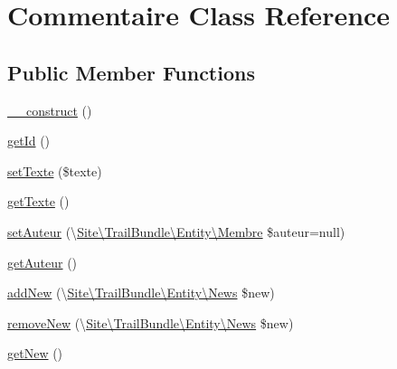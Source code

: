 \hypertarget{class_site_1_1_trail_bundle_1_1_entity_1_1_commentaire}{}\section{Commentaire Class Reference}
\label{class_site_1_1_trail_bundle_1_1_entity_1_1_commentaire}
\subsection*{Public Member Functions}
\begin{DoxyCompactItemize}
\item 
\hyperlink{class_site_1_1_trail_bundle_1_1_entity_1_1_commentaire_a095c5d389db211932136b53f25f39685}{\+\_\+\+\_\+construct} ()
\item 
\hyperlink{class_site_1_1_trail_bundle_1_1_entity_1_1_commentaire_a12251d0c022e9e21c137a105ff683f13}{get\+Id} ()
\item 
\hyperlink{class_site_1_1_trail_bundle_1_1_entity_1_1_commentaire_a77be937e871225b0ec6f0c35b2547008}{set\+Texte} (\$texte)
\item 
\hyperlink{class_site_1_1_trail_bundle_1_1_entity_1_1_commentaire_a8986201ce046ed1b2e684a7d36cdf8ff}{get\+Texte} ()
\item 
\hyperlink{class_site_1_1_trail_bundle_1_1_entity_1_1_commentaire_a78acaef31f36bb40b76345e2a49f7fde}{set\+Auteur} (\textbackslash{}\hyperlink{class_site_1_1_trail_bundle_1_1_entity_1_1_membre}{Site\textbackslash{}\+Trail\+Bundle\textbackslash{}\+Entity\textbackslash{}\+Membre} \$auteur=null)
\item 
\hyperlink{class_site_1_1_trail_bundle_1_1_entity_1_1_commentaire_ad9cbe4cd4561e831bf6a59bdf8571a3b}{get\+Auteur} ()
\item 
\hyperlink{class_site_1_1_trail_bundle_1_1_entity_1_1_commentaire_a6444e1270fcddc9618b8d410965ba2fc}{add\+New} (\textbackslash{}\hyperlink{class_site_1_1_trail_bundle_1_1_entity_1_1_news}{Site\textbackslash{}\+Trail\+Bundle\textbackslash{}\+Entity\textbackslash{}\+News} \$new)
\item 
\hyperlink{class_site_1_1_trail_bundle_1_1_entity_1_1_commentaire_a8e51da8273a2a8f16aa82301e496b17c}{remove\+New} (\textbackslash{}\hyperlink{class_site_1_1_trail_bundle_1_1_entity_1_1_news}{Site\textbackslash{}\+Trail\+Bundle\textbackslash{}\+Entity\textbackslash{}\+News} \$new)
\item 
\hyperlink{class_site_1_1_trail_bundle_1_1_entity_1_1_commentaire_af138a976e957a96252877caf41d9e057}{get\+New} ()
\end{DoxyCompactItemize}


